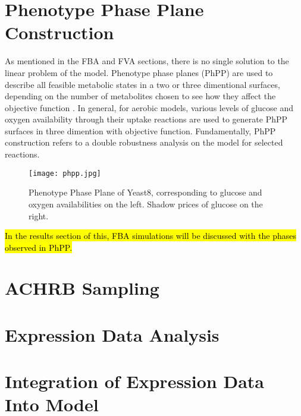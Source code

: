 \section{Phenotype Phase Plane Construction}

As mentioned in the FBA and FVA sections, there is no single solution to the linear problem of the model. Phenotype phase planes (PhPP) are used to describe all feasible metabolic states in a two or three dimentional surfaces, depending on the number of metabolites chosen to see how they affect the objective function \cite{edwards2002characterizing}. In general, for aerobic models, various levels of glucose and oxygen availability through their uptake reactions are used to generate PhPP surfaces in three dimention with objective function. Fundamentally, PhPP construction refers to a double robustness analysis on the model for selected reactions.

\begin{figure}[H]
\begin{center}
\texttt{[image: phpp.jpg]}
\end{center}
\caption[Phenotype Phase Plane of Yeast8]{Phenotype Phase Plane of Yeast8, corresponding to glucose and oxygen availabilities on the left. Shadow prices of glucose on the right.}
\label{fig:phpp}
\end{figure}

\hl{In the results section of this, FBA simulations will be discussed with the phases observed in PhPP.}


\section{ACHRB Sampling}
\section{Expression Data Analysis}
\section{Integration of Expression Data Into Model}
